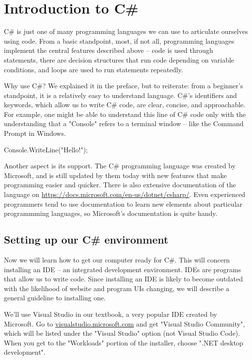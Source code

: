 \documentclass[oneside, openany] {book}
\begin{document}
\section{Introduction to C\#}
C\# is just one of many programming languages we can use to articulate ourselves using code. From a basic standpoint, most, if not all, programming languages implement the central features described above -- code is used through statements, there are decision structures that run code depending on variable conditions, and loops are used to run statements repeatedly.

Why use C\#? We explained it in the preface, but to reiterate: from a beginner's standpoint, it is a relatively easy to understand language. C\#'s identifiers and keywords, which allow us to write C\# code, are clear, concise, and approachable. For example, one might be able to understand this line of C\# code only with the understanding that a "Console" refers to a terminal window -- like the Command Prompt in Windows.

\begin{CSharp}
Console.WriteLine("Hello!");
\end{CSharp}

Another aspect is its support. The C\# programming language was created by Microsoft, and is still updated by them today with new features that make programming easier and quicker. There is also extensive documentation of the language on \url{https://docs.microsoft.com/en-us/dotnet/csharp/}. Even experienced programmers tend to use documentation to learn new elements about particular programmming languages, so Microsoft's documentation is quite handy.  
\subsection{Setting up our C\# environment}
Now we will learn how to get our computer ready for C\#. This will concern installing an IDE -- an integrated development environment. IDEs are programs that allow us to write code. Since installing an IDE is likely to become outdated with the likelihood of website and program UIs changing, we will describe a general guideline to installing one.

We'll use Visual Studio in our textbook, a very popular IDE created by Microsoft. Go to \url{visualstudio.microsoft.com} and get "Visual Studio Community", which will be listed under the "Visual Studio" option (not Visual Studio Code). When you get to the "Workloads" portion of the installer, choose ".NET desktop development".
\end{document}
